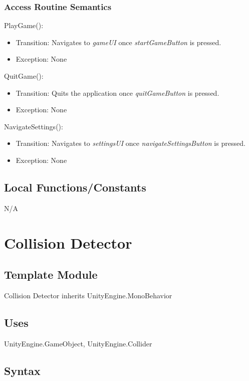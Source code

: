 \documentclass[12pt]{article}
\begin{document}
\subsubsection {Access Routine Semantics}
PlayGame():
\begin{itemize}
    \item Transition: Navigates to \textit{gameUI} once \textit{startGameButton} is pressed.
    \item Exception: None
\end{itemize}


\noindent QuitGame():
\begin{itemize}
    \item Transition: Quits the application once \textit{quitGameButton} is pressed.
    \item Exception: None
\end{itemize}

\noindent NavigateSettings():
\begin{itemize}
    \item Transition: Navigates to \textit{settingsUI} once \textit{navigateSettingsButton} is pressed.
    \item Exception: None
\end{itemize}

\subsection{Local Functions/Constants}
N/A
\medskip


\newpage

\section{Collision Detector}

\subsection{Template Module}
Collision Detector inherits  UnityEngine.MonoBehavior

\subsection {Uses}
UnityEngine.GameObject, UnityEngine.Collider

\subsection {Syntax}
\end{document}
